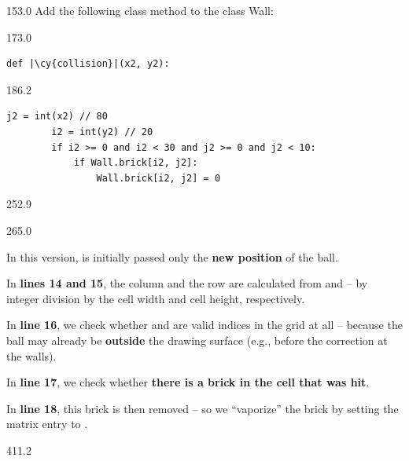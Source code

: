 \documentclass{aslab}
\newcommand*\cy[1]{\textcolor{codecyan}{#1}}
\begin{document}
\begin{region}{153.0}
Add the following class method to the class Wall:
\end{region}

\begin{region}{173.0}
\begin{lstlisting}[style=pyn,firstnumber=13]
    def |\cy{collision}|(x2, y2):
\end{lstlisting}
\end{region}

\begin{region}{186.2}
\begin{lstlisting}[style=pyn,firstnumber=14]
        j2 = int(x2) // 80
        i2 = int(y2) // 20
        if i2 >= 0 and i2 < 30 and j2 >= 0 and j2 < 10:
            if Wall.brick[i2, j2]:
                Wall.brick[i2, j2] = 0
\end{lstlisting}
\end{region}

\begin{region}{252.9}
\end{region}

\begin{region}[pitch=13.75]{265.0}
\begin{dashlist}
\item In this version,  is initially passed only the
  \textbf{new position}  of the ball.
\item In \textbf{lines 14 and 15}, the column  and the row 
  are calculated from  and  -- by integer division by the
  cell width and cell height, respectively.
\item In \textbf{line 16}, we check whether  and  are valid
  indices in the grid at all -- because the ball may already be
  \textbf{outside} the drawing surface (e.g., before the correction at the
  walls).
\item In \textbf{line 17}, we check whether \textbf{there is a brick in the
  cell that was hit}.
\item In \textbf{line 18}, this brick is then removed -- so we ``vaporize''
  the brick by setting the matrix entry to .
\end{dashlist}
\end{region}

\begin{region}{411.2}
\end{region}
\end{document}
